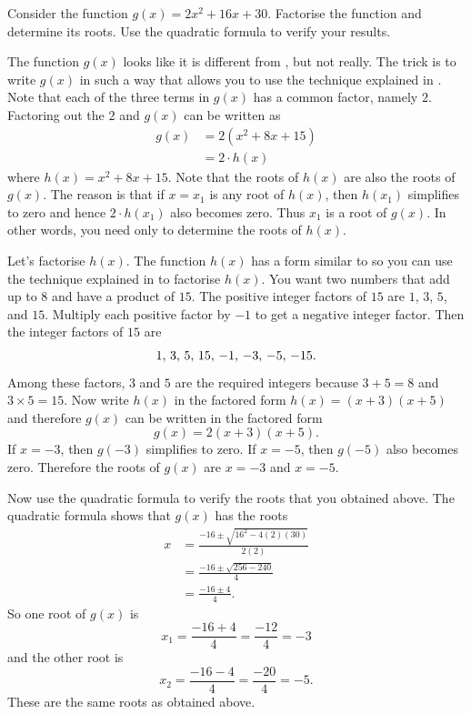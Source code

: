 \documentclass[a4paper,oneside,12pt]{article}
\begin{document}
\begin{example}
Consider the function $g(x) = 2x^2 + 16x + 30$.  Factorise the
function and determine its roots.  Use the quadratic formula to verify
your results.
\end{example}

\begin{solution}
The function $g(x)$ looks like it is different from
, but not really.  The trick
is to write $g(x)$ in such a way that allows you to use the technique
explained in .  Note that each of
the three terms in $g(x)$ has a common factor, namely $2$.  Factoring
out the $2$ and $g(x)$ can be written as
\begin{align*}
g(x)
&=
2 (x^2 + 8x + 15) \\[4pt]
&=
2 \cdot h(x)
\end{align*}
where $h(x) = x^2 + 8x + 15$.  Note that the roots of $h(x)$ are also
the roots of $g(x)$.  The reason is that if $x = x_1$ is any root of
$h(x)$, then $h(x_1)$ simplifies to zero and hence $2 \cdot h(x_1)$
also becomes zero.  Thus $x_1$ is a root of $g(x)$.  In other words,
you need only to determine the roots of $h(x)$.

Let's factorise $h(x)$.  The function $h(x)$ has a form similar to
 so you can use the technique
explained in  to factorise
$h(x)$.  You want two numbers that add up to $8$ and have a product of
$15$.  The positive integer factors of $15$ are $1$, $3$, $5$, and
$15$.  Multiply each positive factor by $-1$ to get a negative integer
factor.  Then the integer factors of $15$ are
\[
{1},\, {3},\, {5},\, {15},\, {-1},\, {-3},\, {-5},\, {-15}.
\]
Among these factors, $3$ and $5$ are the required integers because
$3 + 5 = 8$ and $3 \times 5 = 15$.  Now write $h(x)$ in the factored
form $h(x) = (x + 3) (x + 5)$ and therefore $g(x)$ can be written in
the factored form
\[
g(x)
=
2 (x + 3) (x + 5).
\]
If $x = -3$, then $g(-3)$ simplifies to zero.  If $x = -5$, then
$g(-5)$ also becomes zero.  Therefore the roots of $g(x)$ are
$x = -3$ and $x = -5$.

Now use the quadratic formula to verify the roots that you obtained
above.  The quadratic formula shows that $g(x)$ has the roots
\begin{align*}
x
&=
\frac{
  -16
  \pm
  \sqrt{16^2 - 4(2)(30)}
}{
  2(2)
} \\[4pt]
&=
\frac{
  -16
  \pm
  \sqrt{256 - 240}
}{
  4
} \\[4pt]
&=
\frac{
  -16 \pm 4
}{
  4
}.
\end{align*}
So one root of $g(x)$ is
\[
x_1
=
\frac{-16 + 4}{4}
=
\frac{-12}{4}
=
-3
\]
and the other root is
\[
x_2
=
\frac{-16 - 4}{4}
=
\frac{-20}{4}
=
-5.
\]
These are the same roots as obtained above.
\end{solution}
\end{document}
